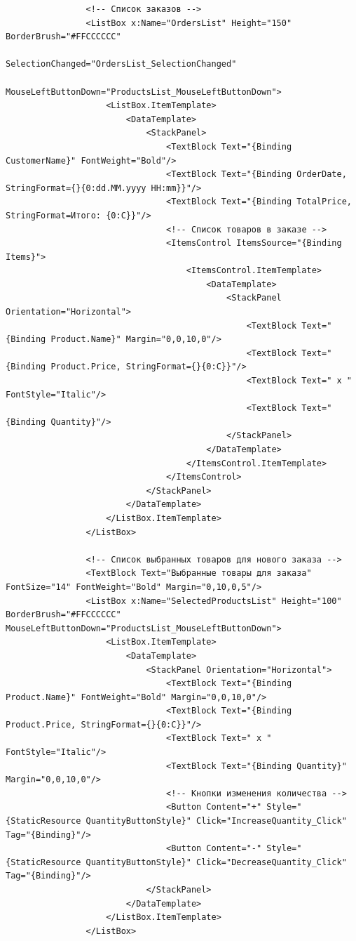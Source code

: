 \documentclass[12pt]{article}
\begin{document}
\begin{lstlisting}
                <!-- Список заказов -->
                <ListBox x:Name="OrdersList" Height="150" BorderBrush="#FFCCCCCC"
                         SelectionChanged="OrdersList_SelectionChanged"
                         MouseLeftButtonDown="ProductsList_MouseLeftButtonDown">
                    <ListBox.ItemTemplate>
                        <DataTemplate>
                            <StackPanel>
                                <TextBlock Text="{Binding CustomerName}" FontWeight="Bold"/>
                                <TextBlock Text="{Binding OrderDate, StringFormat={}{0:dd.MM.yyyy HH:mm}}"/>
                                <TextBlock Text="{Binding TotalPrice, StringFormat=Итого: {0:C}}"/>
                                <!-- Список товаров в заказе -->
                                <ItemsControl ItemsSource="{Binding Items}">
                                    <ItemsControl.ItemTemplate>
                                        <DataTemplate>
                                            <StackPanel Orientation="Horizontal">
                                                <TextBlock Text="{Binding Product.Name}" Margin="0,0,10,0"/>
                                                <TextBlock Text="{Binding Product.Price, StringFormat={}{0:C}}"/>
                                                <TextBlock Text=" x " FontStyle="Italic"/>
                                                <TextBlock Text="{Binding Quantity}"/>
                                            </StackPanel>
                                        </DataTemplate>
                                    </ItemsControl.ItemTemplate>
                                </ItemsControl>
                            </StackPanel>
                        </DataTemplate>
                    </ListBox.ItemTemplate>
                </ListBox>

                <!-- Список выбранных товаров для нового заказа -->
                <TextBlock Text="Выбранные товары для заказа" FontSize="14" FontWeight="Bold" Margin="0,10,0,5"/>
                <ListBox x:Name="SelectedProductsList" Height="100" BorderBrush="#FFCCCCCC" MouseLeftButtonDown="ProductsList_MouseLeftButtonDown">
                    <ListBox.ItemTemplate>
                        <DataTemplate>
                            <StackPanel Orientation="Horizontal">
                                <TextBlock Text="{Binding Product.Name}" FontWeight="Bold" Margin="0,0,10,0"/>
                                <TextBlock Text="{Binding Product.Price, StringFormat={}{0:C}}"/>
                                <TextBlock Text=" x " FontStyle="Italic"/>
                                <TextBlock Text="{Binding Quantity}" Margin="0,0,10,0"/>
                                <!-- Кнопки изменения количества -->
                                <Button Content="+" Style="{StaticResource QuantityButtonStyle}" Click="IncreaseQuantity_Click" Tag="{Binding}"/>
                                <Button Content="-" Style="{StaticResource QuantityButtonStyle}" Click="DecreaseQuantity_Click" Tag="{Binding}"/>
                            </StackPanel>
                        </DataTemplate>
                    </ListBox.ItemTemplate>
                </ListBox>


\end{lstlisting}
\end{document}
